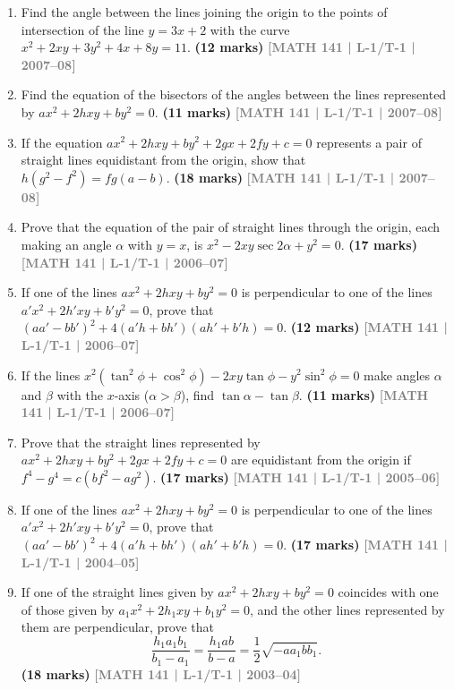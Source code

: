 \documentclass[12pt,a4paper]{article}
\newcommand{\yr}[1]{\hfill\textcolor{gray}{\small\textbf{[#1]}}}
\newcommand{\mk}[1]{\textcolor{orange!70!black}{\small\textbf{(#1 marks)}}}
\begin{document}
\begin{enumerate}
\item Find the angle between the lines joining the origin to the points of intersection of the line $y=3x+2$ with the curve $x^{2}+2xy+3y^{2}+4x+8y=11$.
\mk{12} \yr{MATH 141 | L-1/T-1 | 2007--08}

\item Find the equation of the bisectors of the angles between the lines represented by $ax^{2}+2hxy+by^{2}=0$.
\mk{11} \yr{MATH 141 | L-1/T-1 | 2007--08}

\item If the equation $ax^{2}+2hxy+by^{2}+2gx+2fy+c=0$ represents a pair of straight lines equidistant from the origin, show that $h(g^{2}-f^{2})=fg(a-b)$.
\mk{18} \yr{MATH 141 | L-1/T-1 | 2007--08}

\item Prove that the equation of the pair of straight lines through the origin, each making an angle $\alpha$ with $y=x$, is $x^{2}-2xy\sec 2\alpha+y^{2}=0$.
\mk{17} \yr{MATH 141 | L-1/T-1 | 2006--07}

\item If one of the lines $ax^{2}+2hxy+by^{2}=0$ is perpendicular to one of the lines $a'x^{2}+2h'xy+b'y^{2}=0$, prove that $(aa'-bb')^{2}+4(a'h+bh')(ah'+b'h)=0$.
\mk{12} \yr{MATH 141 | L-1/T-1 | 2006--07}

\item If the lines $x^{2}(\tan^{2}\phi+\cos^{2}\phi)-2xy\tan\phi-y^{2}\sin^{2}\phi=0$ make angles $\alpha$ and $\beta$ with the $x$-axis ($\alpha>\beta$), find $\tan\alpha-\tan\beta$.
\mk{11} \yr{MATH 141 | L-1/T-1 | 2006--07}

\item Prove that the straight lines represented by $ax^{2}+2hxy+by^{2}+2gx+2fy+c=0$ are equidistant from the origin if $f^{4}-g^{4}=c(bf^{2}-ag^{2})$.
\mk{17} \yr{MATH 141 | L-1/T-1 | 2005--06}

\item If one of the lines $ax^{2}+2hxy+by^{2}=0$ is perpendicular to one of the lines $a'x^{2}+2h'xy+b'y^{2}=0$, prove that $(aa'-bb')^{2}+4(a'h+bh')(ah'+b'h)=0$.
\mk{17} \yr{MATH 141 | L-1/T-1 | 2004--05}

\item If one of the straight lines given by $ax^{2}+2hxy+by^{2}=0$ coincides with one of those given by $a_{1}x^{2}+2h_{1}xy+b_{1}y^{2}=0$, and the other lines represented by them are perpendicular, prove that
\[
\frac{h_{1}a_{1}b_{1}}{b_{1}-a_{1}}=\frac{h_{1}ab}{b-a}=\frac{1}{2}\sqrt{-aa_{1}bb_{1}}.
\]
\mk{18} \yr{MATH 141 | L-1/T-1 | 2003--04}




\end{enumerate}
\end{document}
